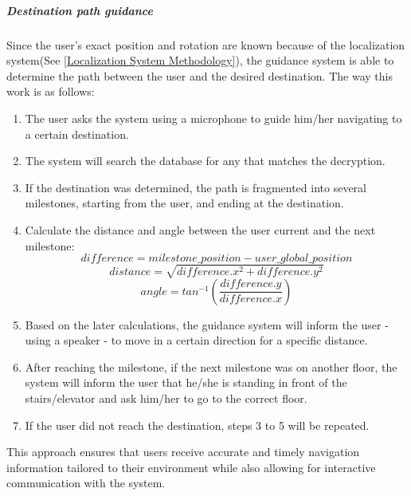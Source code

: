 \subparagraph{Destination path guidance}
Since the user's exact position and rotation are known because of the localization system(See \ref{Localization System Methodology}), the guidance system is able to determine the path between the user and the desired destination. The way this work is as follows:
\begin{enumerate}
	\item The user asks the system using a microphone to guide him/her navigating to a certain destination.
	\item The system will search the database for any that matches the decryption.
	\item If the destination was determined, the path is fragmented into several milestones, starting from the user, and ending at the destination.
	\item Calculate the distance and angle between the user current and the next milestone:
	\begin{equation}
		difference = milestone\_position - user\_global\_position
	\nonumber\end{equation}
	\begin{equation}
		distance = \sqrt{difference.x^2 + difference.y^2}
	\nonumber\end{equation}
	\begin{equation}
		angle = tan^{-1}(\frac{difference.y}{difference.x})
	\nonumber\end{equation}
	\item Based on the later calculations, the guidance system will inform the user - using a speaker - to move in a certain direction for a specific distance.
	\item After reaching the milestone, if the next milestone was on another floor, the system will inform the user that he/she is standing in front of the stairs/elevator and ask him/her to go to the correct floor.
	\item If the user did not reach the destination, steps 3 to 5 will be repeated.
\end{enumerate}

This approach ensures that users receive accurate and timely navigation information tailored to their environment while also allowing for interactive communication with the system.
